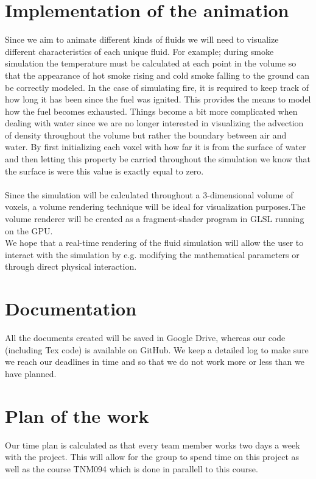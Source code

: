 \documentclass[a4paper,12pt,twoside,swedish]{report}
\begin{document}
\section{Implementation of the animation}
Since we aim to animate different kinds of fluids we will need to visualize different characteristics of each unique fluid.
For example; during smoke simulation the temperature must be calculated at each point in the volume so that the appearance of hot smoke rising and cold smoke falling to the ground can be correctly modeled. In the case of simulating fire, it is required to keep track of how long it has been since the fuel was ignited. This provides the means to model how the fuel becomes exhausted.
Things become a bit more complicated when dealing with water since we are no longer interested in visualizing the advection of density throughout the volume but rather the boundary between air and water. By first initializing each voxel with how far it is from the surface of water and then letting this property be carried throughout the simulation we know that the surface is were this value is exactly equal to zero.\\\\
Since the simulation will be calculated throughout a 3-dimensional volume of voxels, a volume rendering technique will be ideal for visualization purposes.The volume renderer will be created as a fragment-shader program   in GLSL running on the GPU.\\
We hope that a real-time rendering of the fluid simulation will allow the user to interact with the simulation by e.g. modifying the mathematical parameters or through direct physical interaction.\\

\section{Documentation}
All the documents created will be saved in Google Drive, whereas our code (including Tex code) is available on GitHub.
We keep a detailed log to make sure we reach our deadlines in time and so that we do not work more or less than we have planned.

\section{Plan of the work}
Our time plan is calculated as that every team member works two days a week with the project. This will allow for the group to spend time on this project as well as the course TNM094 which is done in parallell to this course.
\end{document}
